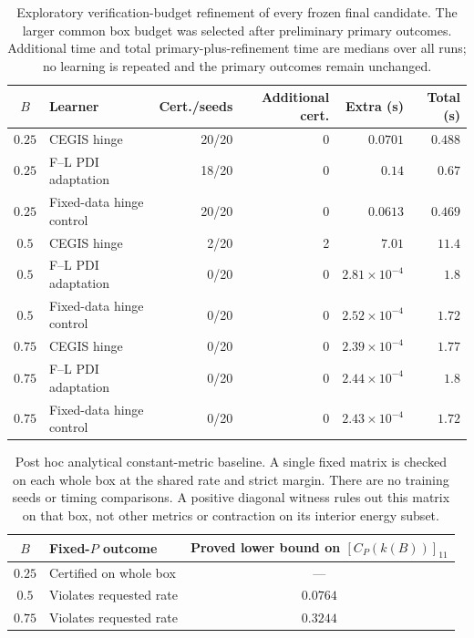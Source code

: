 \begin{table}[t]
\centering\small
\caption{Exploratory verification-budget refinement of every frozen final candidate. The larger common box budget was selected after preliminary primary outcomes. Additional time and total primary-plus-refinement time are medians over all runs; no learning is repeated and the primary outcomes remain unchanged.}
\label{tab:applicationrefinement}
\begin{tabular}{clrrrr}
\hline
$B$ & Learner & Cert./seeds & Additional cert. & Extra (s) & Total (s) \\
\hline
$0.25$ & CEGIS hinge & 20/20 & 0 & $0.0701$ & $0.488$ \\
$0.25$ & F--L PDI adaptation & 18/20 & 0 & $0.14$ & $0.67$ \\
$0.25$ & Fixed-data hinge control & 20/20 & 0 & $0.0613$ & $0.469$ \\
$0.5$ & CEGIS hinge & 2/20 & 2 & $7.01$ & $11.4$ \\
$0.5$ & F--L PDI adaptation & 0/20 & 0 & $2.81 \times 10^{-4}$ & $1.8$ \\
$0.5$ & Fixed-data hinge control & 0/20 & 0 & $2.52 \times 10^{-4}$ & $1.72$ \\
$0.75$ & CEGIS hinge & 0/20 & 0 & $2.39 \times 10^{-4}$ & $1.77$ \\
$0.75$ & F--L PDI adaptation & 0/20 & 0 & $2.44 \times 10^{-4}$ & $1.8$ \\
$0.75$ & Fixed-data hinge control & 0/20 & 0 & $2.43 \times 10^{-4}$ & $1.72$ \\
\hline
\end{tabular}
\end{table}

\begin{table}[t]
\centering\small
\caption{Post hoc analytical constant-metric baseline. A single fixed matrix is checked on each whole box at the shared rate and strict margin. There are no training seeds or timing comparisons. A positive diagonal witness rules out this matrix on that box, not other metrics or contraction on its interior energy subset.}
\label{tab:applicationconstant}
\begin{tabular}{clc}
\hline
$B$ & Fixed-$P$ outcome & Proved lower bound on $[C_P(k(B))]_{11}$ \\
\hline
$0.25$ & Certified on whole box & --- \\
$0.5$ & Violates requested rate & $0.0764$ \\
$0.75$ & Violates requested rate & $0.3244$ \\
\hline
\end{tabular}
\end{table}
